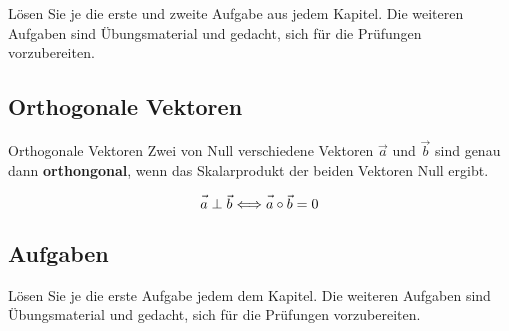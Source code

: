 Lösen Sie je die erste und zweite Aufgabe aus jedem Kapitel. Die weiteren Aufgaben
sind Übungsmaterial und gedacht, sich für die Prüfungen vorzubereiten.




\newpage

\subsection{Orthogonale Vektoren}

\begin{gesetz}{Orthogonale Vektoren}{}
  Zwei von Null verschiedene Vektoren $\vec{a}$ und $\vec{b}$ sind genau dann
  \textbf{orthongonal}, wenn das Skalarprodukt der beiden Vektoren
  Null ergibt.


  $$\vec{\vphantom{b}a} \perp \vec{b} \Longleftrightarrow
  \vec{\vphantom{b}a}\circ{}\vec{b} = 0$$
\end{gesetz}

\subsection*{Aufgaben}

Lösen Sie je die erste Aufgabe jedem dem Kapitel. Die weiteren Aufgaben
sind Übungsmaterial und gedacht, sich für die Prüfungen vorzubereiten.

